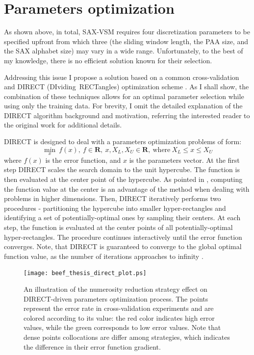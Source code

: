 \section{Parameters optimization} \label{section-direct}
As shown above, in total, SAX-VSM requires four discretization parameters to be specified upfront from which three 
(the sliding window length, the PAA size, and the SAX alphabet size) may vary in a wide range. 
Unfortunately, to the best of my knowledge, there is no efficient solution known for their selection.

Addressing this issue I propose a solution based on a common cross-validation and \mbox{DIRECT} \mbox{(DIviding RECTangles)} 
optimization scheme \cite{citeulike:4210208}. As I shall show, the combination of these techniques allows for 
an optimal parameter selection while using only the training data. For brevity, I omit the detailed explanation 
of the DIRECT algorithm background and motivation, referring the interested reader to the original work 
\cite{citeulike:12563460} for additional details.

DIRECT is designed to deal with a parameters optimization problems of form:
\begin{equation}
 \min_{x} \: f(x), \: f \in \mathbf{R}, \: x, X_{L}, X_{U} \in \mathbf{R}, \: \text{where} \: X_{L} \leq x \leq X_{U}
 \label{formula:direct}
\end{equation} 
where $f(x)$ is the error function, and $x$ is the parameters vector.
At the first step DIRECT scales the search domain to the unit hypercube. The function is then evaluated 
at the center point of the hypercube. As pointed in \cite{citeulike:12563460}, computing the function value
at the center is an advantage of the method when dealing with problems
in higher dimensions.
Then, DIRECT iteratively performs two procedures - partitioning the hypercube into smaller hyper-rectangles 
and identifying a set of potentially-optimal ones by sampling their centers. At each step, the function is evaluated 
at the center points of all potentially-optimal hyper-rectangles. The procedure continues interactively until the 
error function converges. Note, that DIRECT is guaranteed to converge to the global optimal function value,
as the number of iterations approaches to infinity \cite{citeulike:12563460}.

\begin{figure}[!t]
   \centering
   \texttt{[image: beef\_thesis\_direct\_plot.ps]}
   \caption[An illustration of the numerosity reduction strategy effect on parameters optimization process.]
   {An illustration of the numerosity reduction strategy effect on DIRECT-driven parameters optimization process. 
   The points represent the error rate in cross-validation experiments and are colored according to its value: 
   the red color indicates high error values, while the green corresponds to low error values. 
   Note that dense points collocations are differ among strategies, which indicates the difference in their error 
   function gradient.
   }
   \label{fig:sax_nr}
\end{figure}

